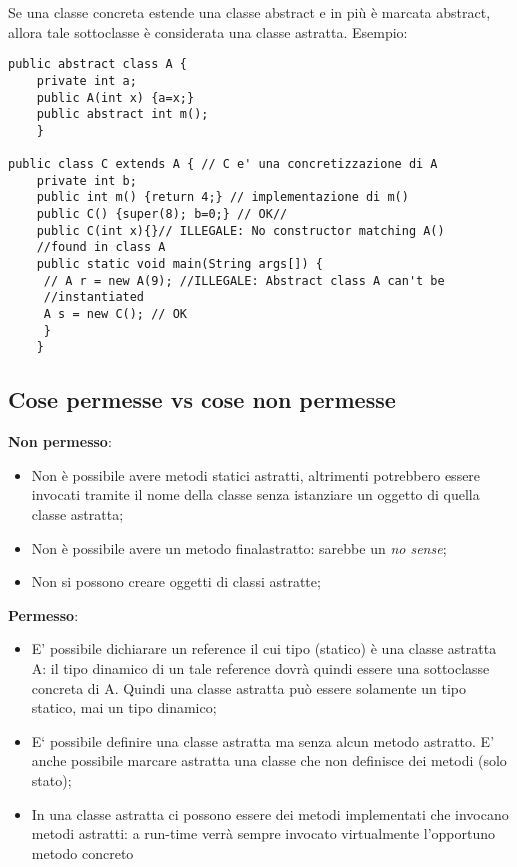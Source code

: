 Se una classe concreta estende una classe abstract e in più è marcata abstract, allora tale sottoclasse è considerata una classe astratta.
Esempio:
\begin{lstlisting}
public abstract class A {
	private int a;
	public A(int x) {a=x;}
	public abstract int m(); 
	}

public class C extends A { // C e' una concretizzazione di A
	private int b;
	public int m() {return 4;} // implementazione di m()
	public C() {super(8); b=0;} // OK//
	public C(int x){}// ILLEGALE: No constructor matching A() 
	//found in class A
	public static void main(String args[]) { 
	 // A r = new A(9); //ILLEGALE: Abstract class A can't be 
	 //instantiated
	 A s = new C(); // OK
	 }  
	}
\end{lstlisting}

\subsection{Cose permesse vs cose non permesse}
\textbf{Non permesso}:
\begin{itemize}
	\item Non è possibile avere metodi statici astratti, altrimenti potrebbero essere invocati tramite il nome della classe senza istanziare un oggetto di quella classe astratta;
	\item Non è possibile avere un metodo finalastratto: sarebbe un \textit{no sense};
	\item Non si possono creare oggetti di classi astratte;
\end{itemize}

\textbf{Permesso}:
\begin{itemize}
	\item E’ possibile dichiarare un reference il cui tipo (statico) è una classe astratta A: il tipo dinamico di un tale reference dovrà quindi essere una sottoclasse concreta di A. Quindi una classe astratta può essere solamente un tipo statico, mai un tipo dinamico;
	\item E` possibile definire una classe astratta ma senza alcun metodo astratto. E’ anche possibile marcare astratta una classe che non definisce dei metodi (solo stato);
	\item In una classe astratta ci possono essere dei metodi implementati che invocano metodi astratti: a run-time verrà sempre invocato virtualmente l'opportuno metodo concreto
\end{itemize}

